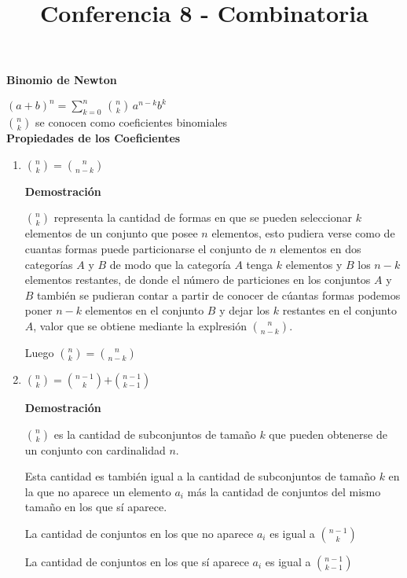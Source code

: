 \documentclass[a4paper,12pt]{report}
\title{Conferencia 8 - Combinatoria}
\author{}
\begin{document}
\maketitle




\textbf{Binomio de Newton}

$(a+b)^n=\sum^n_{k=0}\,$${n}\choose{k}$$\, a^{n-k}b^k$\\

${n}\choose{k}$ se conocen como coeficientes binomiales\\

\textbf{Propiedades de los Coeficientes}

\begin{enumerate}
 \item  ${n}\choose{k}$$=$${n}\choose{n-k}$
 
 \textbf{Demostración}
 
 ${n}\choose{k}$ representa la cantidad de formas en que se pueden seleccionar $k$ elementos de un conjunto que posee $n$ elementos, esto pudiera verse 
 como de cuantas formas puede particionarse el conjunto de $n$ elementos en dos categor\'ias $A$ y $B$ de modo que la categor\'ia $A$ tenga $k$ elementos y $B$ los $n-k$ elementos restantes,
 de donde el n\'umero de particiones en los conjuntos $A$ y $B$ tambi\'en se pudieran contar a partir de conocer de c\'uantas formas podemos poner $n-k$ elementos en el conjunto $B$ y dejar los $k$ restantes en el conjunto $A$, valor que se obtiene 
 mediante la explresi\'on ${n}\choose{n-k}$.

 Luego ${n}\choose{k}$$=$${n}\choose{n-k}$
 
 \item ${n}\choose{k}$$=$${n-1}\choose{k}$$+$${n-1}\choose{k-1}$
 
 \textbf{Demostración}
 
 ${n}\choose{k}$ es la cantidad de subconjuntos de tamaño $k$ que pueden obtenerse de un conjunto con cardinalidad $n$.
 
 Esta cantidad es también igual a la cantidad de subconjuntos de tamaño $k$ en la que no aparece un elemento $a_i$ más la cantidad de conjuntos del mismo tamaño en los que sí aparece.
 
 La cantidad de conjuntos en los que no aparece $a_i$ es igual a ${n-1}\choose{k}$
 
 La cantidad de conjuntos en los que sí aparece $a_i$ es igual a ${n-1}\choose{k-1}$
 

\end{enumerate}
\end{document}
